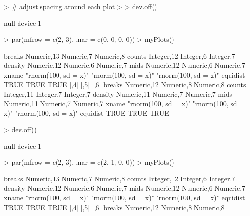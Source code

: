 \documentclass[12pt,letterpaper,final]{article}
\begin{document}
\begin{Schunk}
\begin{Sinput}
> # adjust spacing around each plot
> 
> dev.off()
\end{Sinput}
\begin{Soutput}
null device 
          1 
\end{Soutput}
\begin{Sinput}
> par(mfrow = c(2, 3), mar = c(0, 0, 0, 0))
> myPlots()
\end{Sinput}
\begin{Soutput}
         [,1]                 [,2]                 [,3]                
breaks   Numeric,13           Numeric,7            Numeric,8           
counts   Integer,12           Integer,6            Integer,7           
density  Numeric,12           Numeric,6            Numeric,7           
mids     Numeric,12           Numeric,6            Numeric,7           
xname    "rnorm(100, sd = x)" "rnorm(100, sd = x)" "rnorm(100, sd = x)"
equidist TRUE                 TRUE                 TRUE                
         [,4]                 [,5]                 [,6]                
breaks   Numeric,12           Numeric,8            Numeric,8           
counts   Integer,11           Integer,7            Integer,7           
density  Numeric,11           Numeric,7            Numeric,7           
mids     Numeric,11           Numeric,7            Numeric,7           
xname    "rnorm(100, sd = x)" "rnorm(100, sd = x)" "rnorm(100, sd = x)"
equidist TRUE                 TRUE                 TRUE                
\end{Soutput}
\begin{Sinput}
> dev.off()
\end{Sinput}
\begin{Soutput}
null device 
          1 
\end{Soutput}
\begin{Sinput}
> par(mfrow = c(2, 3), mar = c(2, 1, 0, 0))
> myPlots()
\end{Sinput}
\begin{Soutput}
         [,1]                 [,2]                 [,3]                
breaks   Numeric,13           Numeric,7            Numeric,8           
counts   Integer,12           Integer,6            Integer,7           
density  Numeric,12           Numeric,6            Numeric,7           
mids     Numeric,12           Numeric,6            Numeric,7           
xname    "rnorm(100, sd = x)" "rnorm(100, sd = x)" "rnorm(100, sd = x)"
equidist TRUE                 TRUE                 TRUE                
         [,4]                 [,5]                 [,6]                
breaks   Numeric,12           Numeric,8            Numeric,8           

\end{Soutput}
\end{Schunk}
\end{document}
